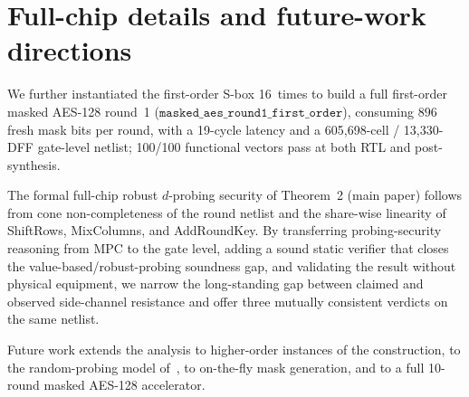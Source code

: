 \documentclass[journal,onecolumn]{IEEEtran}
\begin{document}
\section{Full-chip details and future-work directions}
\label{app:conclusion-extra}

We further
instantiated the first-order S-box 16~times to build a full
first-order masked AES-128 round~1
($\texttt{masked\_aes\_round1\_first\_order}$),
consuming $896$ fresh mask bits per round, with a 19-cycle
latency and a 605{,}698-cell / 13{,}330-DFF gate-level
netlist; 100/100 functional vectors pass at both RTL and
post-synthesis.

The formal
full-chip robust $d$-probing security of
Theorem~2 (main paper) follows from cone non-completeness
of the round netlist and the share-wise linearity of ShiftRows, MixColumns,
and AddRoundKey.  By transferring probing-security reasoning from
MPC to the gate level, adding a sound static verifier that closes
the value-based/robust-probing soundness gap, and validating the
result without physical equipment, we narrow the long-standing gap
between claimed and observed side-channel resistance and offer three
mutually consistent verdicts on the same netlist.

Future work extends the
analysis to higher-order instances of the construction, to the
random-probing model of~\cite{belaid2020random},
to on-the-fly mask generation, and to a full 10-round masked
AES-128 accelerator.



\end{document}
